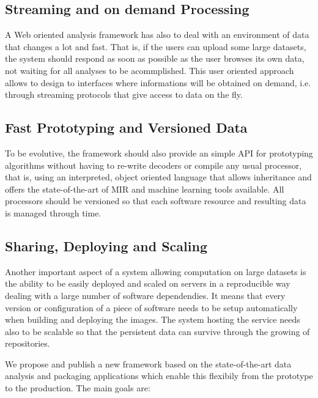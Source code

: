 \documentclass{article}
\begin{document}
\subsection{Streaming and on demand Processing}

A Web oriented analysis framework has also to deal with an environment of data that changes a lot and fast. That is, if the users can upload some large datasets, the system should respond as soon as possible as the user browses its own data, not waiting for all analyses to be acommplished. This user oriented approach allows to design to interfaces where informations will be obtained on demand, i.e. through streaming protocols that give access to data on the fly. 

\subsection{Fast Prototyping and Versioned Data}

To be evolutive, the framework should also provide an simple API for prototyping algorithms without having to re-write decoders or compile any usual processor, that is, using an interpreted, object oriented language that allows inheritance and offers the state-of-the-art of MIR and machine learning tools available. All processors should be versioned so that each software resource and resulting data is managed through time.

\subsection{Sharing, Deploying and Scaling}

Another important aspect of a system allowing computation on large datasets is the ability to be easily deployed and scaled on servers in a reproducible way dealing with a large number of software dependendies. It means that every version or configuration of a piece of software needs to be setup automatically when building and deploying the images. The system hosting the service needs also to be scalable so that the persistent data can survive through the growing of repositories.

We propose and publish a new framework based on the state-of-the-art data analysis and packaging applications which enable this flexibily from the prototype to the production. The main goals are:
\end{document}
